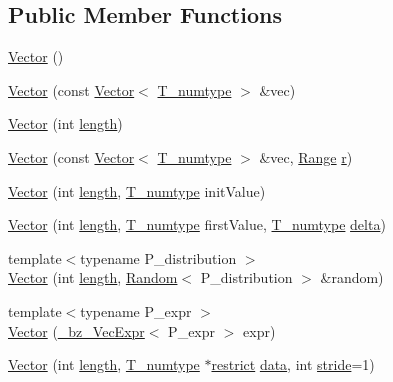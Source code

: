\subsection*{Public Member Functions}
\begin{DoxyCompactItemize}
\item 
\hyperlink{classVector_aee4ac39fec9d9fe9d7e46078faa20edb}{Vector} ()
\item 
\hyperlink{classVector_af05f2b93ab84395815ed1dbd8b5be875}{Vector} (const \hyperlink{classVector}{Vector}$<$ \hyperlink{classVector_a63dfe9fb06d8b4595b9e8fb10fc0755e}{T\+\_\+numtype} $>$ \&vec)
\item 
\hyperlink{classVector_a38be771b9d958001e0b254cf3b803944}{Vector} (int \hyperlink{classVector_ad4853c638cc673c9482cea9b75ef6de2}{length})
\item 
\hyperlink{classVector_a2c4c2092b709e7de633d3176fb3853fc}{Vector} (const \hyperlink{classVector}{Vector}$<$ \hyperlink{classVector_a63dfe9fb06d8b4595b9e8fb10fc0755e}{T\+\_\+numtype} $>$ \&vec, \hyperlink{classRange}{Range} \hyperlink{indexexpr_8h_ac434fd11cc2493608d8d91424d60c17e}{r})
\item 
\hyperlink{classVector_a14396fffa4fcd603bc9a495f1c5c7e63}{Vector} (int \hyperlink{classVector_ad4853c638cc673c9482cea9b75ef6de2}{length}, \hyperlink{classVector_a63dfe9fb06d8b4595b9e8fb10fc0755e}{T\+\_\+numtype} init\+Value)
\item 
\hyperlink{classVector_aa406cba2f7c131bfd2b6f968efe2b9d2}{Vector} (int \hyperlink{classVector_ad4853c638cc673c9482cea9b75ef6de2}{length}, \hyperlink{classVector_a63dfe9fb06d8b4595b9e8fb10fc0755e}{T\+\_\+numtype} first\+Value, \hyperlink{classVector_a63dfe9fb06d8b4595b9e8fb10fc0755e}{T\+\_\+numtype} \hyperlink{vecdelta_8cc_ab9ae226bf3454f87054b7c177fe944f7}{delta})
\item 
{\footnotesize template$<$typename P\+\_\+distribution $>$ }\\\hyperlink{classVector_ab83400c41c70eb060f792e954151c623}{Vector} (int \hyperlink{classVector_ad4853c638cc673c9482cea9b75ef6de2}{length}, \hyperlink{classRandom}{Random}$<$ P\+\_\+distribution $>$ \&random)
\item 
{\footnotesize template$<$typename P\+\_\+expr $>$ }\\\hyperlink{classVector_ae36526e26134ab4dd2f66e287abc74f2}{Vector} (\hyperlink{class__bz__VecExpr}{\+\_\+bz\+\_\+\+Vec\+Expr}$<$ P\+\_\+expr $>$ expr)
\item 
\hyperlink{classVector_ab333be86fbb2c4b59deb8ce7c9f685c6}{Vector} (int \hyperlink{classVector_ad4853c638cc673c9482cea9b75ef6de2}{length}, \hyperlink{classVector_a63dfe9fb06d8b4595b9e8fb10fc0755e}{T\+\_\+numtype} $\ast$\hyperlink{compiler_8h_a080abdcb9c02438f1cd2bb707af25af8}{restrict} \hyperlink{classVector_a5a39ac5863d5fd6e859b782ff4ce956f}{data}, int \hyperlink{classVector_a941b5a6e377ba6a0c127955d8a555ef5}{stride}=1)

\end{DoxyCompactItemize}
